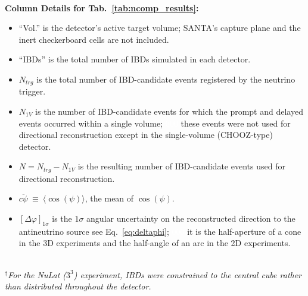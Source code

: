 ~\\
\textbf{Column Details for Tab.~\ref{tab:ncomp_results}:}\label{list:res_coldet}
\begin{itemize}[label=$\bm{\cdot}$]
  \item ``Vol.'' is the detector's active target volume; SANTA's capture plane and the inert checkerboard cells are not included.
  \item ``IBDs'' is the total number of IBDs simulated in each detector.
  \item $N_{trg}$ is the total number of IBD-candidate events registered by the neutrino trigger.
  \item $N_{1V}$ is the number of IBD-candidate events for which the prompt and delayed events occurred within a single volume;
      \textcolor{white}{000} these events were not used for directional reconstruction except in the single-volume (CHOOZ-type) detector.
  \item $N = N_{trg} - N_{1V}$ is the resulting number of IBD-candidate events used for directional reconstruction.
  \item $\overline{c\psi}\ \equiv\ \langle \cos(\psi) \rangle$, the mean of $\cos(\psi)$.
  \item $[\Delta \varphi]_{1\sigma}$ is the $1\sigma$ angular uncertainty on the reconstructed direction to the antineutrino source \dash see Eq.~\ref{eq:deltaphi};
      \textcolor{white}{000} it is the half-aperture of a cone in the 3D experiments and the half-angle of an arc in the 2D experiments.
\end{itemize}
~\\
\emph{$^{\dag}$For the NuLat ($\mathit{3^3}$) experiment, IBDs were constrained to the central cube rather than distributed throughout the detector.} %



